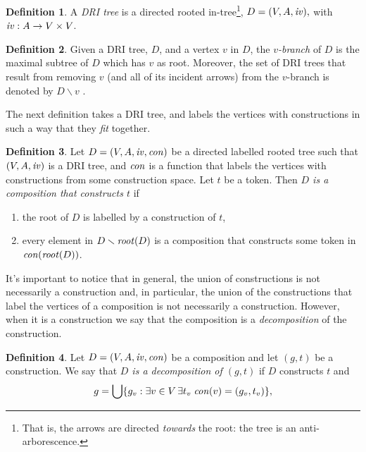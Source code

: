 \documentclass[a4paper]{article}
\theoremstyle{definition}
\newtheorem{definition}{Definition}
\begin{document}
		\begin{definition}\label{defn:decompositionTree}
			A \textit{DRI tree} is a directed rooted in-tree\footnote{That is, the arrows are directed \textit{towards} the root: the tree is an anti-arborescence.},
			$D=(V,A, \mathit{iv}),$ with $\mathit{iv} : A\to V\times V$.
		\end{definition}

	\begin{definition}
		Given a DRI tree, $D$, and a vertex $v$ in $D$, the \textit{$v$-branch} of $D$ is the maximal subtree of $D$ which has $v$ as root. Moreover, the set of DRI trees that result from removing $v$ (and all of its incident arrows) from the $v$-branch is denoted by $D \smallsetminus v$ .
	\end{definition}
	The next definition takes a DRI tree, and labels the vertices with constructions in such a way that they \textit{fit} together.
	\begin{definition}
		Let $D = (V,A,\mathit{iv},\mathit{con})$ be a directed labelled rooted tree such that $(V,A,\mathit{iv})$ is a DRI tree, and $\mathit{con}$ is a function that labels the vertices with constructions from some construction space. Let $t$ be a token. Then \textit{$D$ is a composition that constructs $t$} if
		\begin{enumerate}[itemsep=2pt]
			\item the root of $D$ is labelled by a construction of $t$,
			\item every element in $D \smallsetminus \mathit{root}(D)$ is a composition that constructs some token in $\mathit{con}(\mathit{root}(D))$.
		\end{enumerate}
	\end{definition}
	It's important to notice that in general, the union of constructions is not necessarily a construction and, in particular, the union of the constructions that label the vertices of a composition is not necessarily a construction. However, when it is a construction we say that the composition is a \textit{decomposition} of the construction.


		\begin{definition}\label{defn:constructionOfD}
			Let $D = (V,A,\mathit{iv},\mathit{con})$ be a composition and let $(g,t)$ be a construction. We say that \textit{$D$ is a decomposition of $(g,t)$} if $D$ constructs $t$ and
			\begin{displaymath}
			g=\bigcup \{g_v: \exists v\in V \thinspace \exists t_v \thickspace \mathit{con}(v)=(g_v,t_v)\},
			\end{displaymath}
		\end{definition}
\end{document}
